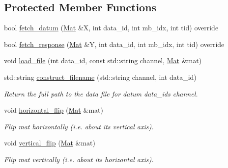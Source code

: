 \subsection*{Protected Member Functions}
\begin{DoxyCompactItemize}
\item 
bool \hyperlink{classlbann_1_1mesh__reader_a0ed2aa6d5ec6509c15d0cf7d9657df29}{fetch\+\_\+datum} (\hyperlink{base_8hpp_a68f11fdc31b62516cb310831bbe54d73}{Mat} \&X, int data\+\_\+id, int mb\+\_\+idx, int tid) override
\item 
bool \hyperlink{classlbann_1_1mesh__reader_acc56c299c9ec75506d2780d2098cbe99}{fetch\+\_\+response} (\hyperlink{base_8hpp_a68f11fdc31b62516cb310831bbe54d73}{Mat} \&Y, int data\+\_\+id, int mb\+\_\+idx, int tid) override
\item 
void \hyperlink{classlbann_1_1mesh__reader_a8cbffa6676c89c44174a7085ea3baeca}{load\+\_\+file} (int data\+\_\+id, const std\+::string channel, \hyperlink{base_8hpp_a68f11fdc31b62516cb310831bbe54d73}{Mat} \&mat)
\item 
std\+::string \hyperlink{classlbann_1_1mesh__reader_a61fd5f3231815ec79eb3cf17070509f9}{construct\+\_\+filename} (std\+::string channel, int data\+\_\+id)
\begin{DoxyCompactList}\small\item\em Return the full path to the data file for datum data\+\_\+id\textquotesingle{}s channel. \end{DoxyCompactList}\item 
void \hyperlink{classlbann_1_1mesh__reader_a8cff71603c2d652f8b000a5dc4c75431}{horizontal\+\_\+flip} (\hyperlink{base_8hpp_a68f11fdc31b62516cb310831bbe54d73}{Mat} \&mat)
\begin{DoxyCompactList}\small\item\em Flip mat horizontally (i.\+e. about its vertical axis). \end{DoxyCompactList}\item 
void \hyperlink{classlbann_1_1mesh__reader_a4b578dc1ba067a07748de0977d97b6bc}{vertical\+\_\+flip} (\hyperlink{base_8hpp_a68f11fdc31b62516cb310831bbe54d73}{Mat} \&mat)
\begin{DoxyCompactList}\small\item\em Flip mat vertically (i.\+e. about its horizontal axis). \end{DoxyCompactList}\end{DoxyCompactItemize}

